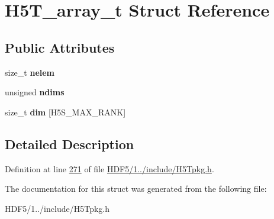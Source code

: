 \hypertarget{struct_h5_t__array__t}{}\section{H5\+T\+\_\+array\+\_\+t Struct Reference}
\label{struct_h5_t__array__t}
\subsection*{Public Attributes}
\begin{DoxyCompactItemize}
\item 
\mbox{\label{struct_h5_t__array__t_ac0023a478ec2659f1d27ea957e777f58}} 
size\+\_\+t {\bfseries nelem}
\item 
\mbox{\label{struct_h5_t__array__t_a60ddf7d74b209eb452c90156cfb2da9b}} 
unsigned {\bfseries ndims}
\item 
\mbox{\label{struct_h5_t__array__t_abf67335618b69afcc308124f9f65f7f5}} 
size\+\_\+t {\bfseries dim} \mbox{[}H5\+S\+\_\+\+M\+A\+X\+\_\+\+R\+A\+NK\mbox{]}
\end{DoxyCompactItemize}


\subsection{Detailed Description}


Definition at line \hyperlink{_h_d_f5_21_810_81_2include_2_h5_tpkg_8h_source_l00271}{271} of file \hyperlink{_h_d_f5_21_810_81_2include_2_h5_tpkg_8h_source}{H\+D\+F5/1../include/\+H5\+Tpkg.\+h}.



The documentation for this struct was generated from the following file\+:\begin{DoxyCompactItemize}
\item 
H\+D\+F5/1../include/\+H5\+Tpkg.\+h\end{DoxyCompactItemize}
